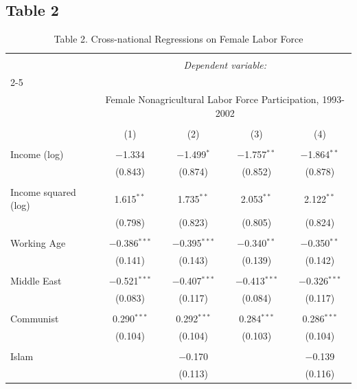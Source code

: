 \documentclass[12pt,letterpaper]{article}
\begin{document}
	\subsection*{Table 2}

	

\begin{table}[!htbp] \centering 
	\caption*{Table 2. Cross-national Regressions on Female Labor Force} 
	\label{} 
	\small 
	\begin{tabular}{@{\extracolsep{1pt}}lcccc} 
		\\[-1.8ex]\hline 
		\hline \\[-1.8ex] 
		& \multicolumn{4}{c}{\textit{Dependent variable:}} \\ 
		\cline{2-5} 
		\\[-1.8ex] & \multicolumn{4}{c}{Female Nonagricultural Labor Force Participation, 1993-2002} \\ 
		\\[-1.8ex] & (1) & (2) & (3) & (4)\\ 
		\hline \\[-1.8ex] 
		Income (log) & $-$1.334 & $-$1.499$^{*}$ & $-$1.757$^{**}$ & $-$1.864$^{**}$ \\ 
		& (0.843) & (0.874) & (0.852) & (0.878) \\ 
		& & & & \\ 
		Income squared (log) & 1.615$^{**}$ & 1.735$^{**}$ & 2.053$^{**}$ & 2.122$^{**}$ \\ 
		& (0.798) & (0.823) & (0.805) & (0.824) \\ 
		& & & & \\ 
		Working Age & $-$0.386$^{***}$ & $-$0.395$^{***}$ & $-$0.340$^{**}$ & $-$0.350$^{**}$ \\ 
		& (0.141) & (0.143) & (0.139) & (0.142) \\ 
		& & & & \\ 
		Middle East & $-$0.521$^{***}$ & $-$0.407$^{***}$ & $-$0.413$^{***}$ & $-$0.326$^{***}$ \\ 
		& (0.083) & (0.117) & (0.084) & (0.117) \\ 
		& & & & \\ 
		Communist & 0.290$^{***}$ & 0.292$^{***}$ & 0.284$^{***}$ & 0.286$^{***}$ \\ 
		& (0.104) & (0.104) & (0.103) & (0.104) \\ 
		& & & & \\ 
		Islam &  & $-$0.170 &  & $-$0.139 \\ 
		&  & (0.113) &  & (0.116) \\ 

\end{tabular}
\end{table}
\end{document}
